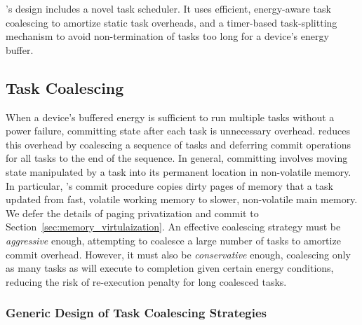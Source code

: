 \sys's design includes a novel task scheduler. It uses efficient, energy-aware task coalescing to amortize static task overheads, and a timer-based task-splitting mechanism to avoid non-termination of tasks too long for a device's energy buffer. 

\subsection{Task Coalescing}
\label{sec:task_coalescing}

When a device's buffered energy is sufficient to run multiple tasks without a power failure, committing state after each task is unnecessary overhead. \sys reduces this overhead by coalescing a sequence of tasks and deferring commit
operations for all tasks to the end of the sequence. In general, committing involves moving state manipulated by a task into its permanent location in non-volatile memory. In particular, \sys's commit procedure copies dirty pages of memory that a task updated from fast, volatile working memory to slower, non-volatile main memory. We defer the details of paging privatization and commit to Section~\ref{sec:memory_virtulaization}.
An effective coalescing strategy must be {\em aggressive} enough, attempting to coalesce a large number of tasks to amortize commit overhead.
However, it must also be  {\em conservative} enough, coalescing only as many tasks as will execute to completion given certain energy conditions, reducing the risk of re-execution penalty for long coalesced tasks.

\subsubsection{Generic Design of Task Coalescing Strategies}
\label{subsec:coalescingGeneral}


